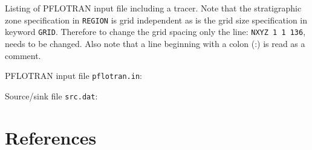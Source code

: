\documentclass[12pt]{article}
\begin{document}
Listing of PFLOTRAN input file including a tracer. Note that the stratigraphic zone specification in {\tt REGION} is grid independent as is the grid size specification in keyword {\tt GRID}. Therefore to change the grid spacing only the line: {\tt NXYZ 1 1 136}, needs to be changed. Also note that a line beginning with a colon (:) is read as a comment.

\bigskip

\noindent PFLOTRAN input file {\tt pflotran.in}: 
\footnotesize
{}

\clearpage

\normalsize
\noindent
Source/sink file {\tt src.dat}:
\footnotesize
{}
\normalsize


\section{References}
\end{document}
